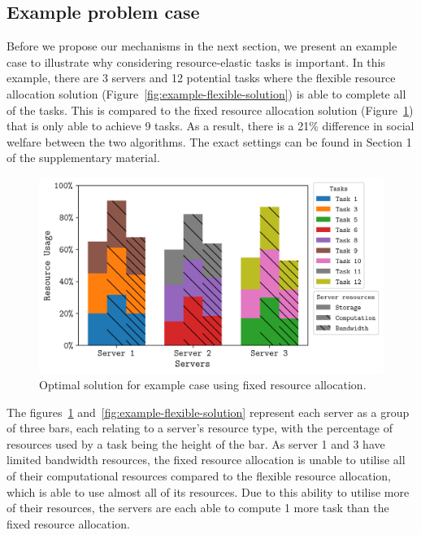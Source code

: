 \subsection{Example problem case}
\label{subsec:example-problem-case}
Before we propose our mechanisms in the next section, we present an example case to illustrate why considering resource-elastic tasks is important. In this example, there are 3 servers and 12 potential tasks where the flexible resource allocation solution (Figure~\ref{fig:example-flexible-solution}) is able to complete all of the tasks. This is compared to the fixed resource allocation solution (Figure~\ref{fig:example-fixed-solution}) that is only able to achieve 9 tasks. As a result, there is a 21\% difference in social welfare between  the two algorithms. The exact settings can be found in Section 1 of the supplementary material.

\begin{figure}[ht]
    \includegraphics[width=\linewidth]{figs/allocation/optimal_fixed_resource_allocation.png}
    \caption{Optimal solution for example case using fixed resource allocation.}
    \label{fig:example-fixed-solution}
\end{figure}

The figures~\ref{fig:example-fixed-solution} and~\ref{fig:example-flexible-solution} represent each server as a group of three bars, each relating to a server's resource type, with the percentage of resources used by a task being the height of the bar. As server 1 and 3 have limited bandwidth resources, the fixed resource allocation is unable to utilise all of their computational resources compared to the flexible resource allocation, which is able to use almost all of its resources. Due to this ability to utilise more of their resources, the servers are each able to compute 1 more task than the fixed resource allocation.

